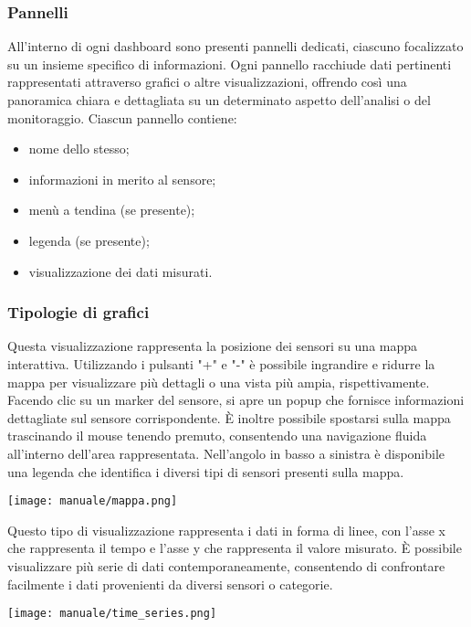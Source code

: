 \subsubsection{Pannelli}
All'interno di ogni dashboard sono presenti pannelli dedicati, ciascuno focalizzato su un insieme specifico di informazioni. Ogni pannello racchiude dati pertinenti rappresentati attraverso grafici o altre visualizzazioni, offrendo così una panoramica chiara e dettagliata su un determinato aspetto dell'analisi o del monitoraggio. Ciascun pannello contiene:
\begin{itemize}
    \item nome dello stesso;
    \item informazioni in merito al sensore;
    \item menù a tendina (se presente);
    \item legenda (se presente);
    \item visualizzazione dei dati misurati.
\end{itemize}

\subsubsection{Tipologie di grafici}
Questa visualizzazione rappresenta la posizione dei sensori su una mappa interattiva. Utilizzando i pulsanti "+" e "-" è possibile ingrandire e ridurre la mappa per visualizzare più dettagli o una vista più ampia, rispettivamente. Facendo clic su un marker del sensore, si apre un popup che fornisce informazioni dettagliate sul sensore corrispondente. È inoltre possibile spostarsi sulla mappa trascinando il mouse tenendo premuto, consentendo una navigazione fluida all'interno dell'area rappresentata. Nell'angolo in basso a sinistra è disponibile una legenda che identifica i diversi tipi di sensori presenti sulla mappa.
\begin{center}
    \texttt{[image: manuale/mappa.png]}
\end{center}

Questo tipo di visualizzazione rappresenta i dati in forma di linee, con l'asse x che rappresenta il tempo e l'asse y che rappresenta il valore misurato. È possibile visualizzare più serie di dati contemporaneamente, consentendo di confrontare facilmente i dati provenienti da diversi sensori o categorie.
\begin{center}
    \texttt{[image: manuale/time\_series.png]}
\end{center} 

